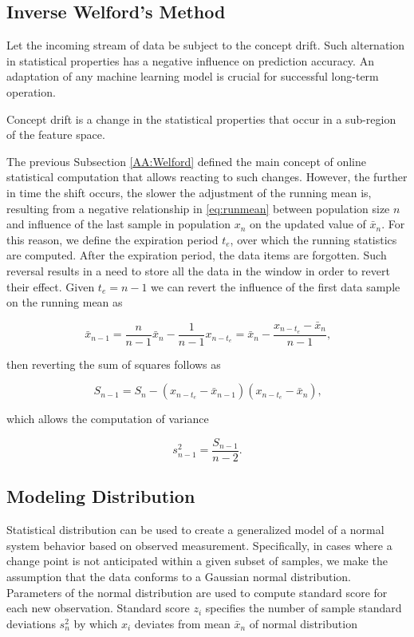 \subsection{Inverse Welford's Method}\label{AA:InvWelford}
Let the incoming stream of data be subject to the concept drift. Such alternation in statistical properties has a negative influence on prediction accuracy. An adaptation of any machine learning model is crucial for successful long-term operation.

\begin{definition}
Concept drift is a change in the statistical properties that occur in a sub-region of the feature space.
\end{definition}

The previous Subsection \ref{AA:Welford} defined the main concept of online statistical computation that allows reacting to such changes. However, the further in time the shift occurs, the slower the adjustment of the running mean is, resulting from a negative relationship in \eqref{eq:runmean} between population size \(n\) and influence of the last sample in population \(x_n\) on the updated value of \(\bar x_{n}\). For this reason, we define the expiration period \(t_e\), over which the running statistics are computed. After the expiration period, the data items are forgotten. Such reversal results in a need to store all the data in the window in order to revert their effect. Given \(t_e=n-1\) we can revert the influence of the first data sample on the running mean as

\begin{equation}
\bar x_{n-1} = \frac{n}{n-1} \bar x_{n} - \frac{1}{n-1}x_{n-t_e} = \bar x_{n} - \frac{x_{n-t_e} - \bar x_{n}}{n-1}\text{,}\label{eq:revmean}
\end{equation}

then reverting the sum of squares follows as

\begin{equation}
S_{n-1} = S_n - (x_{n-t_e} - \bar x_{n-1})(x_{n-t_e} - \bar x_n)\text{,}\label{eq:revrunmean}
\end{equation}

which allows the computation of variance

\begin{equation}
s^2_{n-1} = \frac{S_{n-1}}{n-2}\text{.}\label{eq:revvar}
\end{equation}

\subsection{Modeling Distribution}\label{AA:Distribution}
Statistical distribution can be used to create a generalized model of a normal system behavior based on observed measurement. Specifically, in cases where a change point is not anticipated within a given subset of samples, we make the assumption that the data conforms to a Gaussian normal distribution. Parameters of the normal distribution are used to compute  standard score for each new observation. Standard score $z_i$ specifies the number of sample standard deviations \(s^2_n\) by which \(x_i\) deviates from mean \(\bar x_n\) of normal distribution

